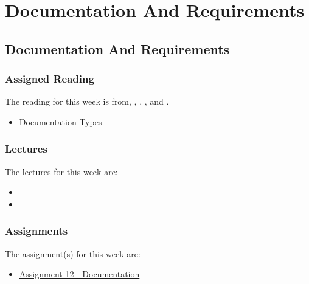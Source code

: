 \clearpage

\renewcommand{\ChapTitle}{Documentation And Requirements}
\renewcommand{\SectionTitle}{Documentation And Requirements}

\chapter{\ChapTitle}

\section{\SectionTitle}

\subsection{Assigned Reading}

The reading for this week is from, \AgileBook, \EngSoftBook, \ProGitBook, and \LinuxBook.

\begin{itemize}
    \item \href{https://helpjuice.com/blog/software-documentation}{Documentation Types}
\end{itemize}

\subsection{Lectures}

The lectures for this week are:

\begin{itemize}
    \item {}
    \item {}
\end{itemize}

\subsection{Assignments}

The assignment(s) for this week are:

\begin{itemize}
    \item \href{https://github.com/cu-cspb-3308-software-dev-summer-2024/lab-12-QuantumCompiler}{Assignment 12 - Documentation}
\end{itemize}


